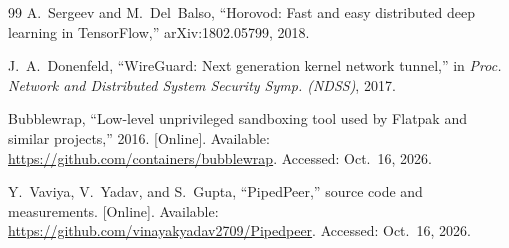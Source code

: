 {\begin{thebibliography}{99}
 A.~Sergeev and M.~Del~Balso, ``Horovod: Fast and easy distributed deep learning in TensorFlow,'' arXiv:1802.05799, 2018.

 J.~A.~Donenfeld, ``WireGuard: Next generation kernel network tunnel,'' in \textit{Proc. Network and Distributed System Security Symp. (NDSS)}, 2017.

 Bubblewrap, ``Low-level unprivileged sandboxing tool used by Flatpak and similar projects,'' 2016. [Online]. Available: \url{https://github.com/containers/bubblewrap}. Accessed: Oct.~16, 2026.

 Y.~Vaviya, V.~Yadav, and S.~Gupta, ``PipedPeer,'' source code and measurements. [Online]. Available: \url{https://github.com/vinayakyadav2709/Pipedpeer}. Accessed: Oct.~16, 2026.

\end{thebibliography}}
